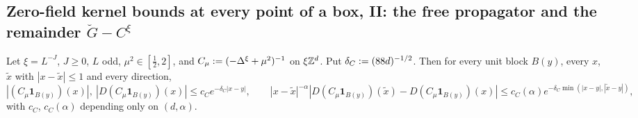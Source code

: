 
\subsection{Zero-field kernel bounds at every point of a box, II: the free propagator and the remainder $\breve G-C^\xi$}\label{sup4:ssec:zeroB}

\begin{lemma}\label{sup4:lem:C1}
Let $\xi=L^{-J}$, $J\ge0$, $L$ odd, $\mu^2\in[\frac12,2]$, and $C_\mu:=(-\Delta^\xi+\mu^2)^{-1}$ on $\xi\mathbb Z^d$. Put $\delta_C:=(88d)^{-1/2}$. Then for every unit block $B(y)$, every $x$, $\tilde x$ with $|x-\tilde x|\le1$ and every direction,
\[
|(C_\mu\mathbf 1_{B(y)})(x)|,\ |D(C_\mu\mathbf 1_{B(y)})(x)|\le c_Ce^{-\delta_C|x-y|},\qquad |x-\tilde x|^{-\alpha}|D(C_\mu\mathbf 1_{B(y)})(\tilde x)-D(C_\mu\mathbf 1_{B(y)})(x)|\le c_C(\alpha)e^{-\delta_C\min(|x-y|,|\tilde x-y|)},
\]
with $c_C$, $c_C(\alpha)$ depending only on $(d,\alpha)$.
\end{lemma}


